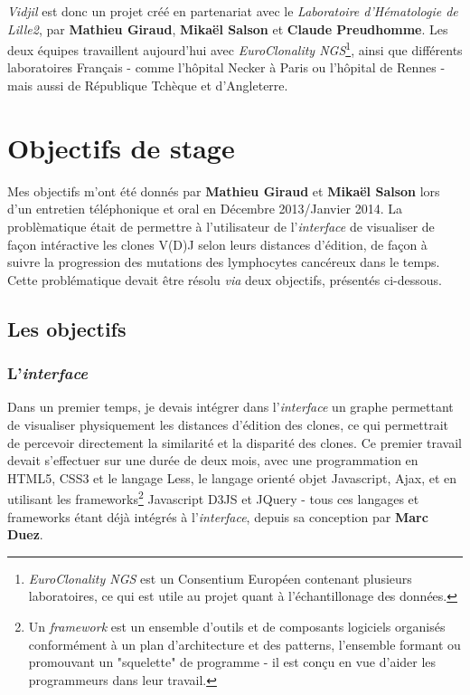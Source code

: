 \documentclass[pdftex,12pt,a4paper]{report}
\begin{document}
\begin{spacing}{1.2}
\textit{Vidjil} est donc un projet créé en partenariat avec le \textit{Laboratoire d'Hématologie de Lille2}, par \textbf{Mathieu Giraud}, \textbf{Mikaël Salson} et \textbf{Claude Preudhomme}.
Les deux équipes travaillent aujourd'hui avec \textit{EuroClonality NGS}\footnote{\textit{EuroClonality NGS} est un Consentium Européen contenant plusieurs laboratoires, ce qui est utile au projet quant à l'échantillonage des données.}, ainsi que différents laboratoires Français - comme l'hôpital Necker à Paris ou l'hôpital de Rennes - mais aussi de République Tchèque et d'Angleterre.

\section{Objectifs de stage}
Mes objectifs m'ont été donnés par \textbf{Mathieu Giraud} et \textbf{Mikaël Salson} lors d'un entretien téléphonique et oral en Décembre 2013/Janvier 2014.
\newline
La problèmatique était de permettre à l'utilisateur de l'\textit{interface} de visualiser de façon intéractive les clones V(D)J selon leurs distances d'édition, de façon à suivre la progression des mutations des lymphocytes cancéreux dans le temps.
\newline
Cette problématique devait être résolu \textit{via} deux objectifs, présentés ci-dessous. 

\subsection{Les objectifs}

\subsubsection{L'\textit{interface}}
Dans un premier temps, je devais intégrer dans l'\textit{interface} un graphe permettant de visualiser physiquement les distances d'édition des clones, ce qui permettrait de percevoir directement la similarité et la disparité des clones.
\newline
Ce premier travail devait s'effectuer sur une durée de deux mois, avec une programmation en HTML5, CSS3 et le langage Less, le langage orienté objet Javascript, Ajax, et en utilisant les frameworks\footnote{Un \textit{framework} est un ensemble d'outils et de composants logiciels organisés conformément à un plan d'architecture et des patterns, l'ensemble formant ou promouvant un "squelette" de programme - il est conçu en vue d'aider les programmeurs dans leur travail.} Javascript D3JS et JQuery - tous ces langages et frameworks étant déjà intégrés à l'\textit{interface}, depuis sa conception par \textbf{Marc Duez}.


\end{spacing}
\end{document}
